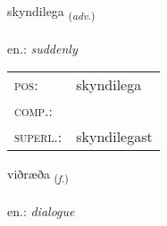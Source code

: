 \documentclass[frontgrid, backgrid]{flacards}\usepackage[]{graphicx}\usepackage[]{xcolor}
\begin{document}
\renewcommand{\flhead}{\vskip5pt \fboxsep=0pt {\small\bfseries\footnotesize Atviksorð | Adverb}}
\renewcommand{\fcfoot}{\vskip5pt \fboxsep=0pt \hspace{2pt}{\small\bfseries\footnotesize 2K}}

\renewcommand{\blhead}{\vskip5pt {\small\bfseries\footnotesize Atviksorð | Adverb }}
\renewcommand{\bcfoot}{\vskip5pt \hspace{2pt}{\small\bfseries\footnotesize 2K}}


{skyndilega \small{\textsubscript{(\textit{adv.})}} \\[1ex] %
\textphonetic{[scɪntɪlɛɣa]} \\
en.: \emph{suddenly} \\  [2ex]
\renewcommand*{\arraystretch}{0.8}
\begin{tabular}{ll}
\textsc{pos}: & skyndilega \\ 
\textsc{comp.}: &  \\ 
\textsc{superl.}: & skyndilegast \\
\end{tabular}
}

\renewcommand{\flhead}{\vskip5pt \fboxsep=0pt {\small\bfseries\footnotesize Nafnorð | Noun}}
\renewcommand{\fcfoot}{\vskip5pt \fboxsep=0pt \hspace{2pt}{\small\bfseries\footnotesize 2K}}

\renewcommand{\blhead}{\vskip5pt {\small\bfseries\footnotesize Nafnorð | Noun }}
\renewcommand{\bcfoot}{\vskip5pt \hspace{2pt}{\small\bfseries\footnotesize 2K}}


{viðræða \small{\textsubscript{(\textit{f.})}} \\[1ex] %
\textphonetic{[vɪðraiða]} \\
en.: \emph{dialogue} \\  [2ex]
\renewcommand*{\arraystretch}{0.8}
}
\end{document}
